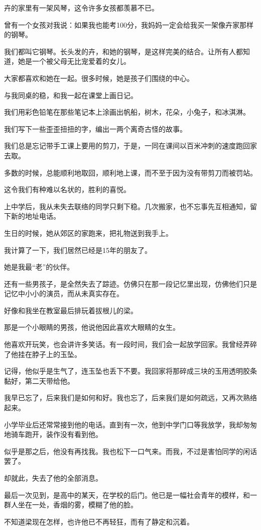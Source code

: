 		卉的家里有一架风琴，这令许多女孩都羡慕不已。\par
		曾有一个女孩对我说：如果我也能考100分，我妈妈一定会给我买一架像卉家那样的钢琴。\par
		我们都叫它钢琴。长头发的卉，和她的钢琴，是这样完美的结合。让所有人都知道，她是一个被父母无比宠爱着的女儿。\par
		大家都喜欢和她在一起。很多时候，她是孩子们围绕的中心。

		与我同桌的稳，和我一起在课堂上画日记。\par
		我们用彩色铅笔在那些笔记本上涂画出帆船，树木，花朵，小兔子，和冰淇淋。\par
		我们写下一些歪歪扭扭的字，编出一两个离奇古怪的故事。\par
		我们总是忘记带手工课上要用的剪刀，于是，一同在课间以百米冲刺的速度跑回家去取。\par
		多数的时候，总能顺利地取回，顺利地上课，而不至于因为没有带剪刀而被罚站。\par
		这令我们有种难以名状的，胜利的喜悦。\par
		上中学后，我从未失去联络的同学只剩下稳。几次搬家，也不忘事先互相通知，留下新的地址电话。\par
		生日的时候，她从郊区的家跑来，把礼物送到我手上。\par
		我计算了一下，我们居然已经是15年的朋友了。\par
		她是我最“老”的伙伴。

		还有一些男孩子，是全然失去了踪迹。仿佛只在那一段记忆里出现，仿佛他们只是记忆中小小的演员，而从未真实存在。

		好像和我坐在教室最后排玩着拔根儿的梁。

		那是一个小眼睛的男孩，他说他因此喜欢大眼睛的女生。\par
		他喜欢开玩笑，也会讲许多笑话。有一段时间，我们会一起放学回家。我曾经弄碎了他挂在脖子上的玉坠。\par
		记得，他似乎是生气了，连玉坠也丢下不要。我回家将那碎成三块的玉用透明胶条黏好，第二天带给他。\par
		我早已忘了，后来我们是如何和好。我也忘了，后来我们是如何疏远，又再次熟络起来。\par
		小学毕业后还常常接到他的电话。直到有一次，他到中学门口等我放学，我却匆匆地骑车跑开，装作没有看到他。\par
		似乎是那之后，他没有再找我。我也松下一口气来。而我，不过是害怕同学的闲话罢了。\par
		却就此，失去了他的全部消息。\par
		最后一次见到，是高中的某天，在学校的后门。他已是一幅社会青年的模样，和一群人坐在一处，香烟的雾，模糊了他的脸。\par
		不知道梁现在怎样，也许他已不再轻狂，而有了静定和沉着。

